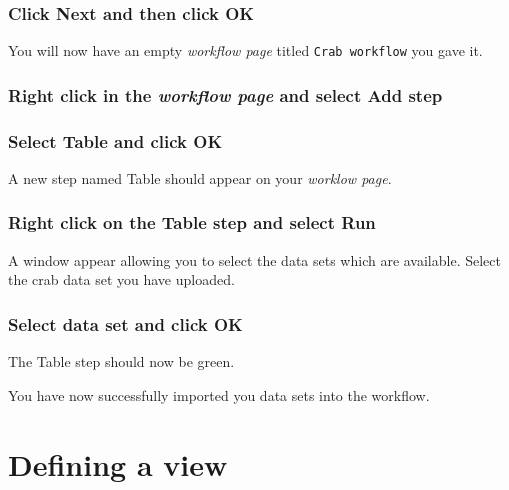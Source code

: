 \documentclass[]{book}
\theoremstyle{definition}
\theoremstyle{definition}
\theoremstyle{remark}
\begin{document}
\subsubsection{\texorpdfstring{Click \textbf{Next} and then click
\textbf{OK}}{Click Next and then click OK}}\label{click-next-and-then-click-ok}

You will now have an empty \emph{workflow page} titled
\texttt{Crab\ workflow} you gave it.

\subsubsection{\texorpdfstring{Right click in the \emph{workflow page}
and select \textbf{Add
step}}{Right click in the workflow page and select Add step}}\label{right-click-in-the-workflow-page-and-select-add-step}

\subsubsection{\texorpdfstring{Select \textbf{Table} and click
\textbf{OK}}{Select Table and click OK}}\label{select-table-and-click-ok}

A new step named Table should appear on your \emph{worklow page}.

\subsubsection{\texorpdfstring{Right click on the Table step and select
\textbf{Run}}{Right click on the Table step and select Run}}\label{right-click-on-the-table-step-and-select-run}

A window appear allowing you to select the data sets which are
available. Select the crab data set you have uploaded.

\subsubsection{\texorpdfstring{Select data set and click
\textbf{OK}}{Select data set and click OK}}\label{select-data-set-and-click-ok}

The Table step should now be green.

You have now successfully imported you data sets into the workflow.

\section{Defining a view}\label{defining-a-view}
\end{document}
